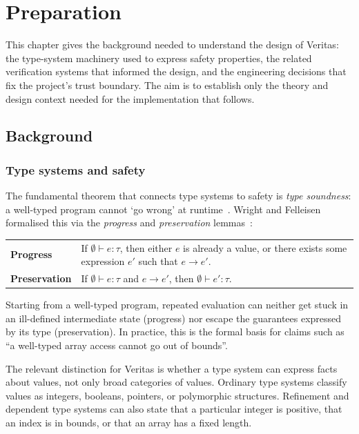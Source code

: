 \chapter{Preparation}\label{ch:prep}

This chapter gives the background needed to understand the design of Veritas: the type-system machinery used to express safety properties, the related verification systems that informed the design, and the engineering decisions that fix the project's trust boundary. The aim is to establish only the theory and design context needed for the implementation that follows.

\section{Background}\label{sec:background}

\subsection{Type systems and safety}

The fundamental theorem that connects type systems to safety is \emph{type soundness}: a well-typed program cannot `go wrong' at runtime~\cite{Milner1978Theory}. Wright and Felleisen formalised this via the \emph{progress} and \emph{preservation} lemmas~\cite{Wright1994Syntactic}:

\begin{center}
\small
\begin{tabularx}{0.94\textwidth}{>{\raggedright\arraybackslash}p{} >{\raggedright\arraybackslash}X}
\toprule
\textbf{Progress} & If $\emptyset \vdash e : \tau$, then either $e$ is already a value, or there exists some expression $e'$ such that $e \to e'$. \\
\textbf{Preservation} & If $\emptyset \vdash e : \tau$ and $e \to e'$, then $\emptyset \vdash e' : \tau$. \\
\bottomrule
\end{tabularx}
\end{center}

\noindent Starting from a well-typed program, repeated evaluation can neither get stuck in an ill-defined intermediate state (progress) nor escape the guarantees expressed by its type (preservation). In practice, this is the formal basis for claims such as ``a well-typed array access cannot go out of bounds''.

The relevant distinction for Veritas is whether a type system can express facts about values, not only broad categories of values. Ordinary type systems classify values as integers, booleans, pointers, or polymorphic structures. Refinement and dependent type systems can also state that a particular integer is positive, that an index is in bounds, or that an array has a fixed length.

